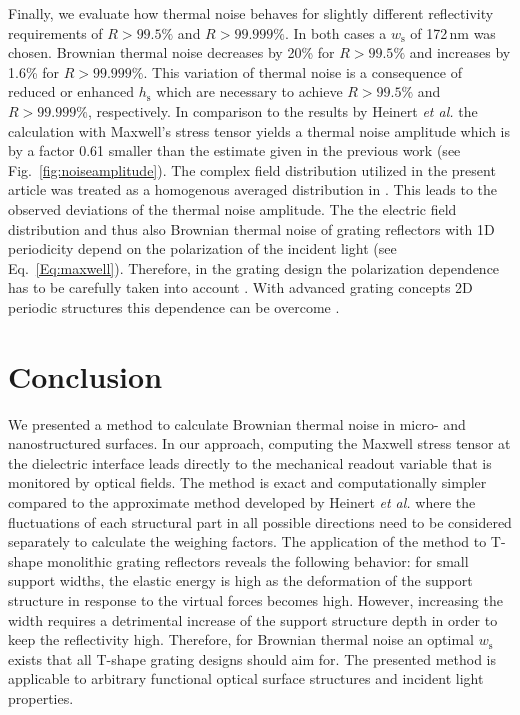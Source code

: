 \documentclass[twocolumn,secnumarabic,amssymb, nobibnotes, aps, prd, showpacs]{revtex4-1}
\begin{document}
\newline 
Finally, we evaluate how thermal noise behaves for slightly different reflectivity requirements of $R>99.5\%$ and $R>99.999\%$. In both cases a $w_\mathrm{s}$ of 172\,nm was chosen. Brownian thermal noise decreases by 20\% for $R>99.5\%$ and increases by 1.6\% for $R>99.999\%$. This variation of thermal noise is a consequence of reduced or enhanced
$h_\mathrm{s}$ which are necessary to achieve $R>99.5\%$ and $R>99.999\%$, respectively.\newline
In comparison to the results by Heinert \textit{et al.} \cite{Hei2013} the calculation with Maxwell's stress tensor yields a thermal noise amplitude which is by a factor 0.61 smaller than the estimate given in the previous work (see Fig.~\ref{fig:noiseamplitude}). The complex field distribution utilized in the present article was treated as a homogenous averaged distribution in \cite{Hei2013}. This leads to the observed deviations of the thermal noise amplitude. 
\newline 
The the electric field distribution and thus also Brownian thermal noise of grating reflectors with 1D periodicity depend on the polarization of the incident light (see Eq.~\ref{Eq:maxwell}). Therefore, in the grating design the polarization dependence has to be carefully taken into account \cite{Dic2017}. With advanced grating concepts 2D periodic structures this dependence can be overcome \cite{Kro2013}.


\section{Conclusion}

\noindent We presented a method to calculate Brownian thermal noise in micro- and nanostructured surfaces. In our approach, computing the Maxwell stress tensor at the dielectric interface leads directly to the mechanical readout variable that is monitored by optical fields. The method is exact and computationally simpler compared to the approximate method developed by Heinert \textit{et al.} \cite{Hei2013} where the fluctuations of each structural part in all possible directions need to be considered separately to calculate the weighing factors. The application of the method to T-shape monolithic grating reflectors reveals the following behavior: for small support widths, the elastic energy is high as the deformation of the support structure in response to the virtual forces becomes high. However, increasing the width requires a detrimental increase of the support structure depth in order to keep the reflectivity high. Therefore, for Brownian thermal noise an optimal $w_\mathrm{s}$ exists that all T-shape grating designs should aim for. The presented method is applicable to arbitrary functional optical surface structures and incident light properties. 
\end{document}
